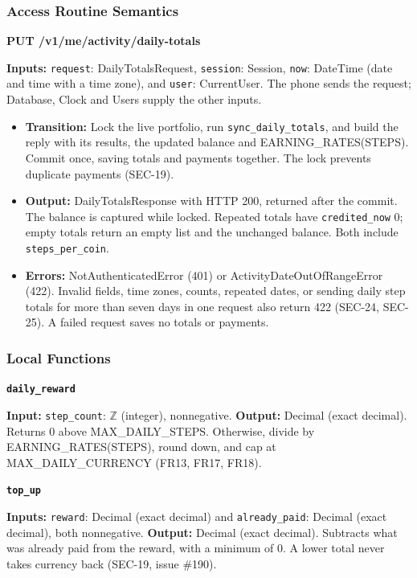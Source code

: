 \documentclass[12pt, titlepage]{article}
\begin{document}
\subsubsection{Access Routine Semantics}

\noindent \textbf{PUT /v1/me/activity/daily-totals}

\medskip
\noindent \textbf{Inputs:} \texttt{request}: DailyTotalsRequest,
\texttt{session}: Session, \texttt{now}: DateTime (date and time with a time zone),
and \texttt{user}: CurrentUser.
The phone sends the request; Database, Clock and Users supply the other inputs.

\begin{itemize}
\raggedright
\item \textbf{Transition:} Lock the live portfolio, run
  \texttt{sync\_daily\_totals}, and build the reply with its results,
  the updated balance and EARNING\_RATES(STEPS). Commit once, saving totals
  and payments together. The lock prevents duplicate payments (SEC-19).
\item \textbf{Output:} DailyTotalsResponse with HTTP 200, returned after
  the commit. The balance is captured while locked. Repeated totals have
  \texttt{credited\_now} 0; empty totals return an empty list and the
  unchanged balance. Both include \texttt{steps\_per\_coin}.
\item \textbf{Errors:} NotAuthenticatedError (401) or
  ActivityDateOutOfRangeError (422). Invalid fields, time zones, counts,
  repeated dates, or sending daily step totals for more than seven days in
  one request also return 422 (SEC-24, SEC-25).
  A failed request saves no totals or payments.
\end{itemize}

\subsubsection{Local Functions}

\noindent \textbf{\texttt{daily\_reward}}

{\raggedright\noindent \textbf{Input:} \texttt{step\_count}: $\mathbb{Z}$ (integer), nonnegative.
\textbf{Output:} Decimal (exact decimal).
Returns 0 above MAX\_DAILY\_STEPS. Otherwise, divide by EARNING\_RATES(STEPS),
round down, and cap at MAX\_DAILY\_CURRENCY (FR13, FR17, FR18).\par}

\medskip
\noindent \textbf{\texttt{top\_up}}

\noindent \textbf{Inputs:} \texttt{reward}: Decimal (exact decimal) and
\texttt{already\_paid}: Decimal (exact decimal), both nonnegative.
\textbf{Output:} Decimal (exact decimal).
Subtracts what was already paid from the reward, with a minimum of 0.
A lower total never takes currency back (SEC-19, issue \#190).
\end{document}
